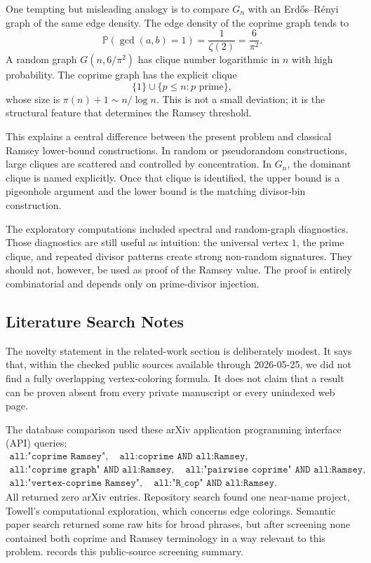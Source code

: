 \documentclass[11pt]{article}
\theoremstyle{plain}
\theoremstyle{definition}
\theoremstyle{remark}
\begin{document}
One tempting but misleading analogy is to compare $G_n$ with an
Erd\H{o}s--R\'enyi graph of the same edge density.  The edge density of the
coprime graph tends to
\[
  \mathbb{P}(\gcd(a,b)=1)=\frac{1}{\zeta(2)}=\frac{6}{\pi^2}.
\]
A random graph $G(n,6/\pi^2)$ has clique number logarithmic in $n$ with high
probability.  The coprime graph has the explicit clique
\[
  \{1\}\cup\{p\le n:p\text{ prime}\},
\]
whose size is $\pi(n)+1\sim n/\log n$.  This is not a small deviation; it is
the structural feature that determines the Ramsey threshold.

This explains a central difference between the present problem and classical
Ramsey lower-bound constructions.  In random or pseudorandom constructions,
large cliques are scattered and controlled by concentration.  In $G_n$, the
dominant clique is named explicitly.  Once that clique is identified, the
upper bound is a pigeonhole argument and the lower bound is the matching
divisor-bin construction.

The exploratory computations included spectral and random-graph diagnostics.
Those diagnostics are still useful as intuition: the universal
vertex $1$, the prime clique, and repeated divisor patterns create strong
non-random signatures.  They should not, however, be used as proof of the
Ramsey value.  The proof is entirely combinatorial and depends only on
prime-divisor injection.

\subsection{Literature Search Notes}
\label{app:literature-search}

The novelty statement in the related-work section is deliberately modest.
It says that, within the checked public sources available through
2026-05-25, we did not find a fully overlapping vertex-coloring formula.  It
does not claim that a result can be proven absent from every private
manuscript or every unindexed web page.

The database comparison used these arXiv application programming interface
(API) queries:
\[
\begin{gathered}
\texttt{all:"coprime Ramsey"},\quad
\texttt{all:coprime AND all:Ramsey},\\
\texttt{all:"coprime graph" AND all:Ramsey},\quad
\texttt{all:"pairwise coprime" AND all:Ramsey},\\
\texttt{all:"vertex-coprime Ramsey"},\quad
\texttt{all:"R\_cop" AND all:Ramsey}.
\end{gathered}
\]
All returned zero arXiv entries.  Repository search found one near-name
project, Towell's computational exploration, which concerns edge colorings.
Semantic paper search returned some raw hits for broad phrases, but after
screening none contained both coprime and Ramsey terminology in a way
relevant to this problem.   records this public-source
screening summary.
\end{document}
